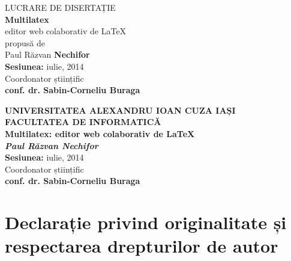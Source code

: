 \documentclass[a4wide,12pt]{report}
\newcommand{\subtitlu}{editor web colaborativ de \LaTeX}
\newcommand{\titlu}{Multilatex: \subtitlu}
\newcommand{\autor}{Paul Răzvan Nechifor} %
\newcommand{\coordonator}{conf. dr. Sabin-Corneliu Buraga}
\newcommand{\sesiunea}{iulie, 2014}
\begin{document}
\begin{center}
    \centering
    \color{white}
    {\fontsize{22}{26}\selectfont \textsf{LUCRARE DE DISERTAȚIE}}\\
    \vspace{1.5cm}
    {\fontsize{40}{46}\selectfont \textsf{\textbf{Multilatex}}}\\
    \vspace{0.5cm}
    {\fontsize{26}{28}\selectfont \textsf{\subtitlu}}\\
    \vspace{1.5cm}
    \large{\textsf{propusă de}}\\
    \vspace{1.5cm}
    {\fontsize{26}{28}\selectfont \textsf{Paul Răzvan \textbf{Nechifor}}}\\
    \vspace{1.5cm}
    {\fontsize{16}{26}\selectfont \textsf{\textbf{Sesiunea:} \sesiunea}}\\
    \vspace{1.5cm}
    {\fontsize{14}{26}\selectfont \textsf{Coordonator științific}}\\
    {\fontsize{18}{26}\selectfont \textsf{\textbf{\coordonator}}}\\
\end{center}

\pagebreak

\begin{center}
    \textbf{UNIVERSITATEA ALEXANDRU IOAN CUZA IAȘI}\\
    \vspace{3mm}
    \textbf{FACULTATEA DE INFORMATICĂ}\\
    \vspace{89mm}
    \Huge{\textbf{\titlu}}\\
    \vspace{30mm}
    \Large{\textbf{\emph{\autor}}}\\
    \vspace{11mm}
    \Large{\textbf{Sesiunea:} \sesiunea}\\
    \vspace{10mm}
    \normalsize{Coordonator științific}\\
    \vspace{3mm}
    \large{\textbf{\coordonator}}\\
    \end{center}
\pagebreak

\section*{Declarație privind originalitate și respectarea drepturilor de autor}
\end{document}
